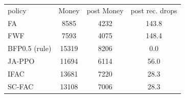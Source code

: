 \begin{tabular}{lccc}
\hline
policy & Money & post Money & post rec. drops\\
FA & 8585 & 4232 & 143.8\\
FWF & 7593 & 4075 & 148.4\\
BFP0.5 (rule) & 15319 & 8206 & 0.0\\
JA-PPO & 11694 & 6114 & 56.0\\
IFAC & 13681 & 7220 & 28.3\\
SC-FAC & 13108 & 7006 & 28.3\\
\hline
\end{tabular}